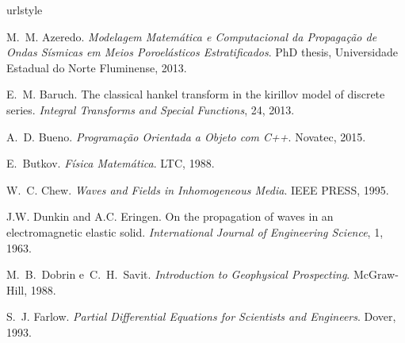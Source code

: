\documentclass[12pt,a4paper,openany]{abntex2}
\begin{document}
\tableofcontents











%

\begin{thebibliography}{25}
\providecommand{\natexlab}[1]{#1}
\providecommand{\url}[1]{\texttt{#1}}
\expandafter\ifx\csname urlstyle\endcsname\relax
  \providecommand{\doi}[1]{doi: #1}\else
  \providecommand{\doi}{doi: \begingroup \urlstyle{rm}\Url}\fi

M.~M. Azeredo.
\newblock \emph{Modelagem Matem\'atica e Computacional da Propaga\c{c}\~ao de
  Ondas S\'ismicas em Meios Poroel\'asticos Estratificados}.
\newblock PhD thesis, Universidade Estadual do Norte Fluminense, 2013.

E.~M. Baruch.
\newblock The classical hankel transform in the kirillov model of discrete
  series.
\newblock \emph{Integral Transforms and Special Functions}, 24, 2013.

A.~D. Bueno.
\newblock \emph{Programa\c{c}\~ao Orientada a Objeto com C++}.
\newblock Novatec, 2015.

E.~Butkov.
\newblock \emph{F\'isica Matem\'atica}.
\newblock LTC, 1988.

W.~C. Chew.
\newblock \emph{Waves and Fields in Inhomogeneous Media}.
\newblock IEEE PRESS, 1995.

J.W. Dunkin and A.C. Eringen.
\newblock On the propagation of waves in an electromagnetic elastic solid.
\newblock \emph{International Journal of Engineering Science}, 1, 1963.

M.~B.~Dobrin e~C.~H.~Savit.
\newblock \emph{Introduction to Geophysical Prospecting}.
\newblock McGraw-Hill, 1988.

S.~J. Farlow.
\newblock \emph{Partial Differential Equations for Scientists and Engineers}.
\newblock Dover, 1993.


\end{thebibliography}
\end{document}
